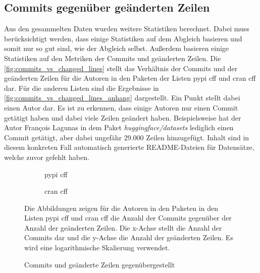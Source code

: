 \subsection*{Commits gegenüber geänderten Zeilen}
Aus den gesammelten Daten wurden weitere Statistiken berechnet.
Dabei muss berücksichtigt werden, dass einige Statistiken auf dem Abgleich basieren und somit nur so gut sind, wie der Abgleich selbst.
Außerdem basieren einige Statistiken auf den Metriken der Commits und geänderten Zeilen.
Die \autoref{fig:commits_vs_changed_lines} stellt das Verhältnis der Commits und der geänderten Zeilen für die Autoren in den Paketen der Listen \gls{pypi} \gls{cff} und \gls{cran} \gls{cff} dar.
Für die anderen Listen sind die Ergebnisse in \autoref{fig:commits_vs_changed_lines_anhang} dargestellt.
Ein Punkt stellt dabei einen Autor dar.
Es ist zu erkennen, dass einige Autoren nur einen Commit getätigt haben und dabei viele Zeilen geändert haben.
Beispielsweise hat der Autor François Lagunas in dem Paket \emph{huggingface/datasets} lediglich einen Commit getätigt, aber dabei ungefähr 29.000 Zeilen hinzugefügt.
Inhalt sind in diesem konkreten Fall automatisch generierte README-Dateien für Datensätze, welche zuvor gefehlt haben.

\begin{figure}
    \begin{subfigure}{.5\textwidth}
        \centering
        
        \caption{\gls{pypi} \gls{cff}}
        \label{fig:commits_vs_changed_lines_pypi_cff}
    \end{subfigure}%
    \begin{subfigure}{.5\textwidth}
        \centering
        
        \caption{\gls{cran} \gls{cff}}
        \label{fig:commits_vs_changed_lines_cran_cff}
    \end{subfigure}
    \caption{Commits und geänderte Zeilen gegenübergestellt}
    \label{fig:commits_vs_changed_lines}
    \small
    Die Abbildungen zeigen für die Autoren in den Paketen in den Listen \gls{pypi} \gls{cff} und \gls{cran} \gls{cff} die Anzahl der Commits gegenüber der Anzahl der geänderten Zeilen. Die x-Achse stellt die Anzahl der Commits dar und die y-Achse die Anzahl der geänderten Zeilen. Es wird eine logarithmische Skalierung verwendet.
\end{figure}


